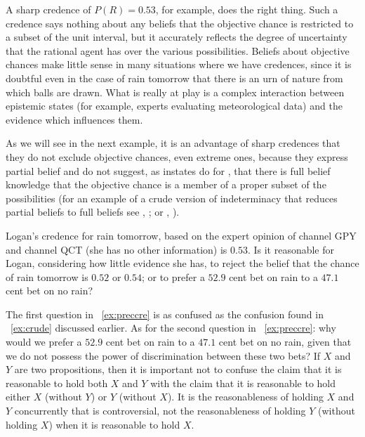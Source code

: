 \documentclass[phd,12pt,oneside]{ubcthesis}
\begin{document}
A sharp credence of $P(R)=0.53$, for example, does the right thing.
Such a credence says nothing about any beliefs that the objective
chance is restricted to a subset of the unit interval, but it
accurately reflects the degree of uncertainty that the rational agent
has over the various possibilities. Beliefs about objective chances
make little sense in many situations where we have credences, since it
is doubtful even in the case of rain tomorrow that there is an urn of
nature from which balls are drawn. What is really at play is a complex
interaction between epistemic states (for example, experts evaluating
meteorological data) and the evidence which influences them.

As we will see in the next example, it is an advantage of sharp
credences that they do not exclude objective chances, even extreme
ones, because they express partial belief and do not suggest, as
instates do for {\anderson}, that there is full belief knowledge
that the objective chance is a member of a proper subset of the
possibilities (for an example of a crude version of indeterminacy that
reduces partial beliefs to full beliefs see ,
; or ,
).

\begin{quotex}
  \label{ex:preccre} Logan's credence for
  rain tomorrow, based on the expert opinion of channel GPY and
  channel QCT (she has no other information) is $0.53$. Is it
  reasonable for Logan, considering how little evidence she has, to
  reject the belief that the chance of rain tomorrow is $0.52$ or
  $0.54$; or to prefer a $52.9$ cent bet on rain to a $47.1$ cent bet
  on no rain?
\end{quotex}

The first question in {\xample}~\ref{ex:preccre} is as confused as the
{\anderson} confusion found in {\xample}~\ref{ex:crude} discussed
earlier. As for the second question in {\xample}~\ref{ex:preccre}: why
would we prefer a $52.9$ cent bet on rain to a $47.1$ cent bet on no
rain, given that we do not possess the power of discrimination between
these two bets? If $X$ and $Y$ are two propositions, then it is
important not to confuse the claim that it is reasonable to hold both
$X$ and $Y$ with the claim that it is reasonable to hold either $X$
(without $Y$) or $Y$ (without $X$). It is the reasonableness of
holding $X$ and $Y$ concurrently that is controversial, not the
reasonableness of holding $Y$ (without holding $X$) when it is
reasonable to hold $X$.
\end{document}

